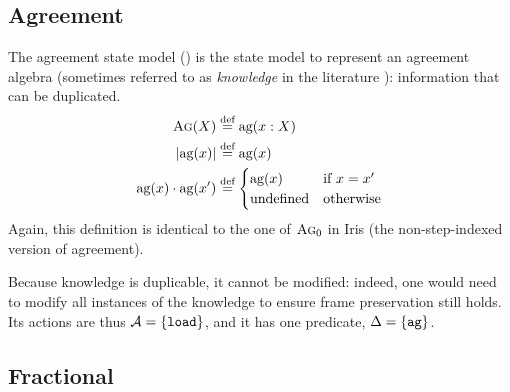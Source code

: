 \subsection{Agreement}

The agreement state model \Ag{}(\Val) is the state model to represent an agreement algebra (sometimes referred to as \emph{knowledge} in the literature \cite{higherorderseplogic}): information that can be duplicated. \begin{align*}
	\textsc{Ag}(X) &\stackrel{\textnormal{def}}= \text{ag}(x: X)\\
	|\text{ag}(x)| &\stackrel{\textnormal{def}}= \text{ag}(x)\\
	\text{ag}(x) \cdot \text{ag}(x') &\stackrel{\textnormal{def}}= \begin{cases}
 	\text{ag}(x) &\text{if}~x = x' \\
 	\text{undefined} &\text{otherwise}
 \end{cases}
\end{align*}
Again, this definition is identical to the one of $\textsc{Ag}_0$ in Iris (the non-step-indexed version of agreement).

Because knowledge is duplicable, it cannot be modified: indeed, one would need to modify all instances of the knowledge to ensure frame preservation still holds. Its actions are thus ${\cal{A}}=\{\texttt{load}\}$, and it has one predicate, $\Delta=\{\texttt{ag}\}$.

\subsection{Fractional}

